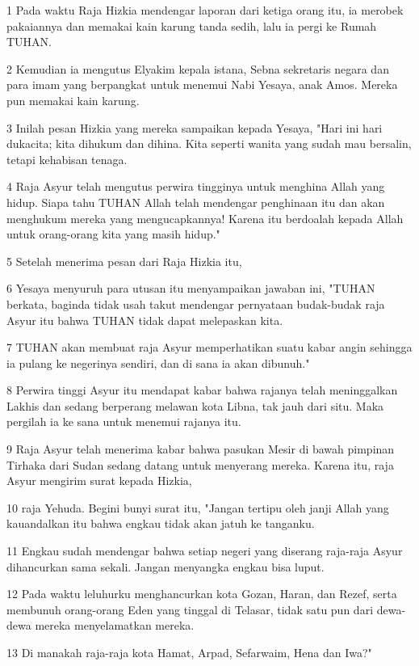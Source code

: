 \par 1 Pada waktu Raja Hizkia mendengar laporan dari ketiga orang itu, ia merobek pakaiannya dan memakai kain karung tanda sedih, lalu ia pergi ke Rumah TUHAN.
\par 2 Kemudian ia mengutus Elyakim kepala istana, Sebna sekretaris negara dan para imam yang berpangkat untuk menemui Nabi Yesaya, anak Amos. Mereka pun memakai kain karung.
\par 3 Inilah pesan Hizkia yang mereka sampaikan kepada Yesaya, "Hari ini hari dukacita; kita dihukum dan dihina. Kita seperti wanita yang sudah mau bersalin, tetapi kehabisan tenaga.
\par 4 Raja Asyur telah mengutus perwira tingginya untuk menghina Allah yang hidup. Siapa tahu TUHAN Allah telah mendengar penghinaan itu dan akan menghukum mereka yang mengucapkannya! Karena itu berdoalah kepada Allah untuk orang-orang kita yang masih hidup."
\par 5 Setelah menerima pesan dari Raja Hizkia itu,
\par 6 Yesaya menyuruh para utusan itu menyampaikan jawaban ini, "TUHAN berkata, baginda tidak usah takut mendengar pernyataan budak-budak raja Asyur itu bahwa TUHAN tidak dapat melepaskan kita.
\par 7 TUHAN akan membuat raja Asyur memperhatikan suatu kabar angin sehingga ia pulang ke negerinya sendiri, dan di sana ia akan dibunuh."
\par 8 Perwira tinggi Asyur itu mendapat kabar bahwa rajanya telah meninggalkan Lakhis dan sedang berperang melawan kota Libna, tak jauh dari situ. Maka pergilah ia ke sana untuk menemui rajanya itu.
\par 9 Raja Asyur telah menerima kabar bahwa pasukan Mesir di bawah pimpinan Tirhaka dari Sudan sedang datang untuk menyerang mereka. Karena itu, raja Asyur mengirim surat kepada Hizkia,
\par 10 raja Yehuda. Begini bunyi surat itu, "Jangan tertipu oleh janji Allah yang kauandalkan itu bahwa engkau tidak akan jatuh ke tanganku.
\par 11 Engkau sudah mendengar bahwa setiap negeri yang diserang raja-raja Asyur dihancurkan sama sekali. Jangan menyangka engkau bisa luput.
\par 12 Pada waktu leluhurku menghancurkan kota Gozan, Haran, dan Rezef, serta membunuh orang-orang Eden yang tinggal di Telasar, tidak satu pun dari dewa-dewa mereka menyelamatkan mereka.
\par 13 Di manakah raja-raja kota Hamat, Arpad, Sefarwaim, Hena dan Iwa?"
